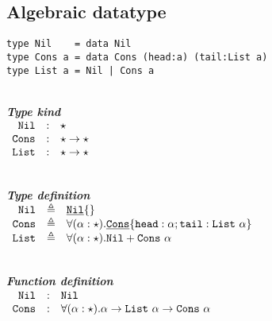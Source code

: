 \documentclass{article}[11pt]
\newcommand{\subsubsubsection}[1]
{
    ~\\
    {\bf {\em #1}} \\
}
\newcommand{\term}[1]{\verb~#1~}
\newcommand{\cons}[1]{\underline{\verb~#1~}}
\begin{document}
    \subsection{Algebraic datatype}\label{subsec:algebraic-datatype}

    \begin{verbatim}
type Nil    = data Nil
type Cons a = data Cons (head:a) (tail:List a)
type List a = Nil | Cons a
    \end{verbatim}

    \subsubsubsection{Type kind}

    \noindent
    \begin{math}
        \begin{array}{rclp{5cm}}
            \term{Nil}  & : & \star                   \\
            \term{Cons} & : & \star \rightarrow \star \\
            \term{List} & : & \star \rightarrow \star
        \end{array}
    \end{math}

    \subsubsubsection{Type definition}

    \noindent
    \begin{math}
        \begin{array}{rclp{5cm}}
            \term{Nil}  & \triangleq & \cons{Nil}\{\}                                                                                \\
            \term{Cons} & \triangleq & \forall(\alpha:\star).\cons{Cons}\{ \term{head} :\alpha; \term{tail} : \term{List} ~\alpha \} \\
            \term{List} & \triangleq & \forall(\alpha:\star).\term{Nil} + \term{Cons} ~ \alpha
        \end{array}
    \end{math}

    \subsubsubsection{Function definition}

    \noindent
    \begin{math}
        \begin{array}{rclp{5cm}}
            \term{Nil}  & : & \term{Nil}                                                                                   \\
            \term{Cons} & : & \forall(\alpha:\star).\alpha \rightarrow \term{List}~\alpha \rightarrow \term{Cons} ~ \alpha \\
        \end{array}
    \end{math}
\end{document}
